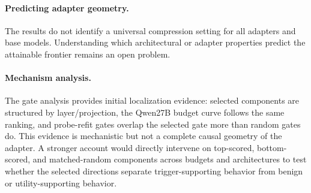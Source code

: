 \paragraph{Predicting adapter geometry.}
The results do not identify a universal compression setting for all adapters and base models.
Understanding which architectural or adapter properties predict the attainable frontier remains an open problem.

\paragraph{Mechanism analysis.}
The gate analysis provides initial localization evidence: selected components are structured by layer/projection, the Qwen27B budget curve follows the same ranking, and probe-refit gates overlap the selected gate more than random gates do.
This evidence is mechanistic but not a complete causal geometry of the adapter.
A stronger account would directly intervene on top-scored, bottom-scored, and matched-random components across budgets and architectures to test whether the selected directions separate trigger-supporting behavior from benign or utility-supporting behavior.
